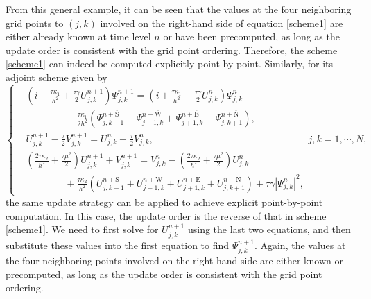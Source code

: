 \documentclass[fleqn,11pt]{elsarticle}
\numberwithin{equation}{section}
\begin{document}
From this general example, it can be seen that the values at the four neighboring grid points to $(j,k)$ involved on the right-hand side of equation \eqref{scheme1} are either already known at time level $n$ or have been precomputed, as long as the update order is consistent with the grid point ordering. Therefore, the scheme \eqref{scheme1} can indeed be computed explicitly point-by-point. Similarly, for its adjoint scheme given by
\begin{equation}\label{scheme1-adj}
	\left\{\begin{aligned}
		 & (i-\frac{\tau\kappa_1}{h^2}+\frac{\tau\gamma}{2}U_{j,k}^{n+1}) \Psi_{j,k}^{n+1}=(i+\frac{\tau\kappa_1}{h^2}-\frac{\tau\gamma}{2} U_{j,k}^n)\Psi_{j,k}^{n}                                                           \\
		 & \qquad\qquad-\frac{\tau\kappa_1}{2h^2}(\Psi_{j,k-1}^{n+\overline{\text{S}}}+\Psi_{j-1, k}^{n+\overline{\text{W}}} + \Psi_{j+1, k}^{n+\overline{\text{E}}} + \Psi_{j, k+1}^{n+\overline{\text{N}}}),                 \\
		 & U_{j,k}^{n+1}-\frac{\tau}{2} V_{j,k}^{n+1}=U_{j,k}^n+\frac{\tau}{2} V_{j,k}^{n},                                                                                                                                    \\
		 & (\frac{2\tau\kappa_2}{h^2}+\frac{\tau\mu^2}{2} )U_{j,k}^{n+1}+V_{j,k}^{n+1}=V_{j,k}^n-(\frac{2\tau\kappa_2}{h^2}+\frac{\tau\mu^2}{2}) U_{j,k}^{n}                                                                   \\
		 & \qquad\qquad+\frac{\tau\kappa_2}{h^2}(U_{j,k-1}^{n+\overline{\text{S}}}+U_{j-1, k}^{n+\overline{\text{W}}}+ U_{j+1, k}^{n+\overline{\text{E}}} + U_{j, k+1}^{n+\overline{\text{N}}})+\tau\gamma |\Psi_{j,k}^{n}|^2,
	\end{aligned}\right.j, k = 1, \cdots, N,
\end{equation}
the same update strategy can be applied to achieve explicit point-by-point computation. In this case, the update order is the reverse of that in scheme \eqref{scheme1}. We need to first solve for $U_{j,k}^{n+1}$ using the last two equations, and then substitute these values into the first equation to find $\Psi_{j,k}^{n+1}$. Again, the values at the four neighboring points involved on the right-hand side are either known or precomputed, as long as the update order is consistent with the grid point ordering.
\end{document}
